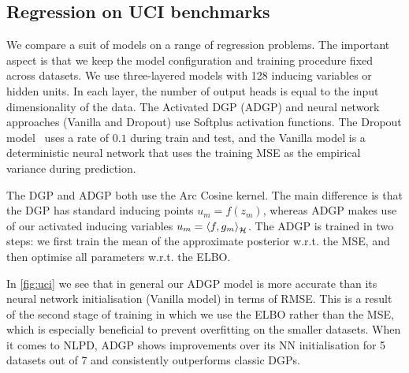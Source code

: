 
\subsection{Regression on UCI benchmarks}
We compare a suit of models on a range of regression problems. The important aspect is that we keep the model configuration and training procedure fixed across datasets. We use three-layered models with 128 inducing variables or hidden units. In each layer, the number of output heads is equal to the input dimensionality of the data. The Activated DGP (ADGP) and neural network approaches (Vanilla and Dropout) use Softplus activation functions. The Dropout model~\citep{Gal2016dropout} uses a rate of $0.1$ during train and test, and the Vanilla model is a deterministic neural network that uses the training MSE as the empirical variance during prediction.

The DGP and ADGP both use the Arc Cosine kernel. The main difference is that the DGP has standard inducing points $u_m = f(z_m)$, whereas ADGP makes use of our activated inducing variables $u_m = \langle f, g_m \rangle_{{\mathcal{H}}}^{}$. The ADGP is trained in two steps: we first train the mean of the approximate posterior w.r.t. the MSE, and then optimise all parameters w.r.t. the ELBO.

In \cref{fig:uci} we see that in general our ADGP model is more accurate than its neural network initialisation (Vanilla model) in terms of RMSE. This is a result of the second stage of training in which we use the ELBO rather than the MSE, which is especially beneficial to prevent overfitting on the smaller datasets. When it comes to NLPD, ADGP shows improvements over its NN initialisation for 5 datasets out of 7 and consistently outperforms classic DGPs.

